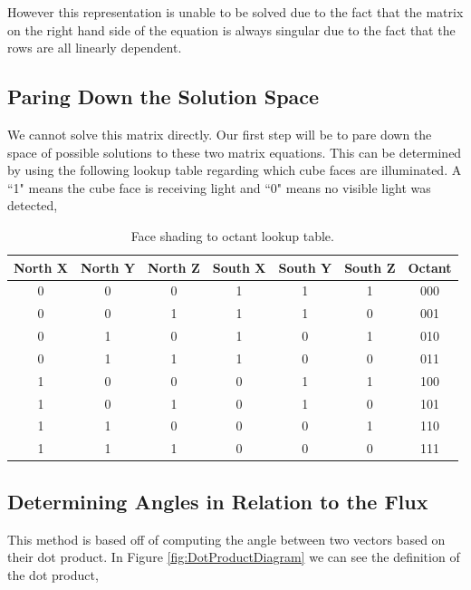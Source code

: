 \documentclass[10pt, letterpaper]{article}
\begin{document}
However this representation is unable to be solved due to the fact that the matrix on the right hand side of the equation is always singular due to the fact that the rows are all linearly dependent.

\subsection{Paring Down the Solution Space}
We cannot solve this matrix directly. Our first step will be to pare down the space of possible solutions to these two matrix equations. This can be determined by using the following lookup table regarding which cube faces are illuminated. A ``1" means the cube face is receiving light and ``0" means no visible light was detected,


\begin{table}[H]
\centering
    \begin{tabular}{|c|c|c|c|c|c|c|}
    \hline
        North X & North Y & North Z & South X & South Y & South Z & Octant \\ \hline
        0 & 0 & 0 & 1 & 1 & 1 &  000 \\
        0 & 0 & 1 & 1 & 1 & 0 &  001 \\
        0 & 1 & 0 & 1 & 0 & 1 &  010 \\
        0 & 1 & 1 & 1 & 0 & 0 &  011 \\
        1 & 0 & 0 & 0 & 1 & 1 &  100 \\
        1 & 0 & 1 & 0 & 1 & 0 &  101 \\
        1 & 1 & 0 & 0 & 0 & 1 &  110 \\
        1 & 1 & 1 & 0 & 0 & 0 &  111 \\ \hline
    \end{tabular}
    \label{table:FaceShadingtoOctant}
    \caption{Face shading to octant lookup table.}
\end{table}


\subsection{Determining Angles in Relation to the Flux}

This method is based off of computing the angle between two vectors based on their dot product. In Figure \ref{fig:DotProductDiagram} we can see the definition of the dot product,
\end{document}
